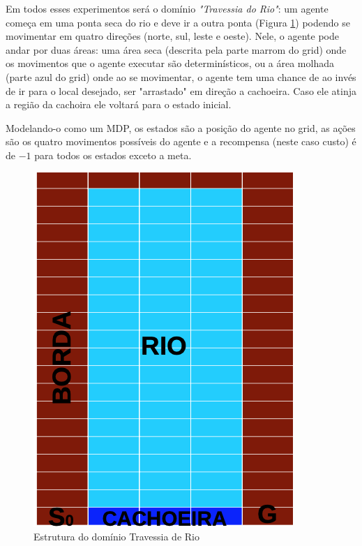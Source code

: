 \documentclass[letterpaper]{article}
\begin{document}
Em todos esses experimentos será o domínio \emph{"Travessia do Rio"}: um agente começa em uma ponta seca do rio e deve ir a outra ponta (Figura \ref{fig:river-traversal-scheme}) podendo se movimentar em quatro direções (norte, sul, leste e oeste). Nele, o agente pode andar por duas áreas: uma área seca (descrita pela parte marrom do grid) onde os movimentos que o agente executar são determinísticos, ou a área molhada (parte azul do grid) onde ao se movimentar, o agente tem uma chance de ao invés de ir para o local desejado, ser "arrastado" em direção a cachoeira. Caso ele atinja a região da cachoira ele voltará para o estado inicial.

Modelando-o como um MDP, os estados são a posição do agente no grid, as ações são os quatro movimentos possíveis do agente e a recompensa (neste caso custo) é de $-1$ para todos os estados exceto a meta.

\begin{figure}[t]
    \centering
    \includegraphics[width=0.9\columnwidth]{river-traversal}
    \caption{Estrutura do domínio Travessia de Rio}
    \label{fig:river-traversal-scheme}
\end{figure}
\end{document}
